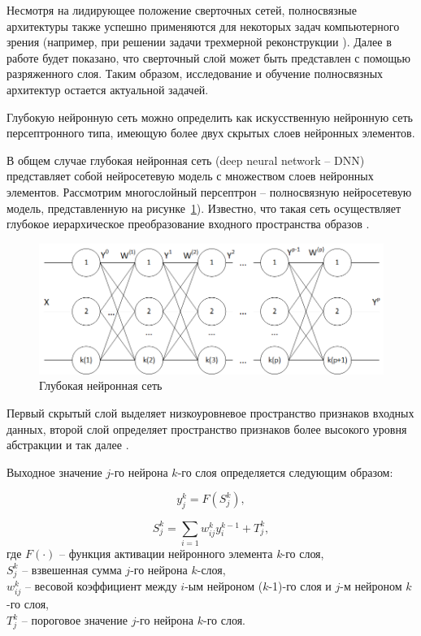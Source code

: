 Несмотря на лидирующее положение сверточных сетей, полносвязные архитектуры также успешно применяются для некоторых задач компьютерного зрения (например, при решении задачи трехмерной реконструкции \cite{mildenhall2020nerf}). Далее в работе будет показано, что сверточный слой может быть представлен с помощью разряженного слоя. Таким образом, исследование и обучение полносвязных архитектур остается актуальной задачей. 

Глубокую нейронную сеть можно определить как искусственную нейронную сеть персептронного типа, имеющую более двух скрытых слоев нейронных элементов.

В общем случае глубокая нейронная сеть (deep neural network -- DNN) представляет собой нейросетевую модель с множеством слоев нейронных элементов. Рассмотрим многослойный персептрон -- полносвязную нейросетевую модель, представленную на рисунке~\ref{fig:pic1_1}). Известно, что такая сеть осуществляет глубокое иерархическое преобразование входного пространства образов \cite{n5}. 

\begin{figure}[H]
  \centering
  \includegraphics[width=\textwidth]{man-source/images/ch1/pic1-1.png}
  \caption{Глубокая нейронная сеть}
  \label{fig:pic1_1}
\end{figure}

Первый скрытый слой выделяет низкоуровневое пространство признаков входных данных, второй слой определяет пространство признаков более высокого уровня абстракции и так далее \cite{n3}. 

Выходное значение $j$-го нейрона $k$-го слоя определяется следующим образом:

\begin{equation}
y_j^k=F(S_j^k),
\end{equation}

\begin{equation}
S_j^k=\sum_{i=1} w_{ij}^ky_i^{k-1}+T_j^k,
\end{equation}
где $F(\cdot)$ -- функция активации нейронного элемента \textit{k}-го слоя,\\
$S_j^k$ -- взвешенная сумма $j$-го нейрона $k$-слоя,\\
$w_{ij}^k$ -- весовой коэффициент между $i$-ым нейроном ($k$-1)-го слоя и $j$-м нейроном $k$-го слоя,\\
$T_j^k$ -- пороговое значение $j$-го нейрона $k$-го слоя.


